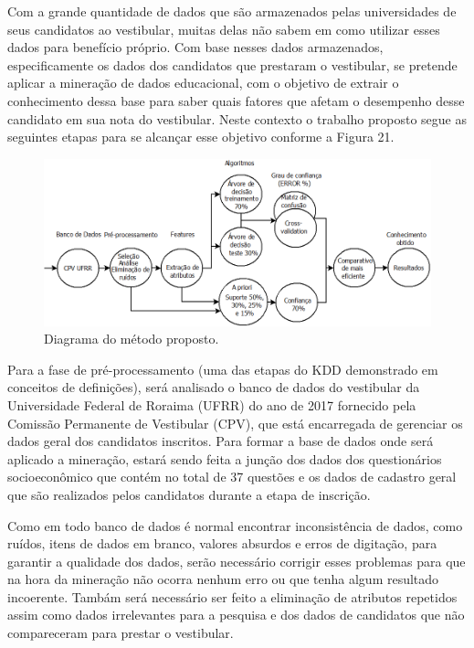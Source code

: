 \label{chapter:metodo}

\par
Com a grande quantidade de dados que são armazenados pelas universidades de seus candidatos ao vestibular, muitas delas não sabem em como utilizar esses dados para benefício próprio. Com base nesses dados armazenados, especificamente os dados dos candidatos que prestaram o vestibular, se pretende aplicar a mineração de dados educacional, com o objetivo de extrair o conhecimento dessa base para saber quais fatores que afetam o desempenho desse candidato em sua nota do vestibular. Neste contexto o trabalho proposto segue as seguintes etapas para se alcançar esse objetivo conforme a Figura 21.

\par
\begin{figure}[!htp]
	\begin{center}
    \caption{\label{fig:waveform_fig} Diagrama do método proposto.}
	\includegraphics[scale=0.46]{Figuras/Caso_de_uso_metodo_TCC1.png}
	\end{center}
\end{figure}

\par
Para a fase de pré-processamento (uma das etapas do KDD demonstrado em conceitos de definições), será analisado o banco de dados do vestibular da Universidade Federal de Roraima (UFRR) do ano de 2017 fornecido pela Comissão Permanente de Vestibular (CPV), que está encarregada de gerenciar os dados geral dos candidatos inscritos. Para formar a base de dados onde será aplicado a mineração, estará sendo feita a junção dos dados dos questionários socioeconômico que contém no total de 37 questões e os dados de cadastro geral que são realizados pelos candidatos durante a etapa de inscrição.


\par
Como em todo banco de dados é normal encontrar inconsistência de dados, como ruídos, itens de dados em branco, valores absurdos e erros de digitação, para garantir a qualidade dos dados, serão necessário corrigir esses problemas para que na hora da mineração não ocorra nenhum erro ou que tenha algum resultado incoerente. Tambám será necessário ser feito a eliminação de atributos repetidos assim como dados irrelevantes para a pesquisa e dos dados de candidatos que não compareceram para prestar o vestibular.


